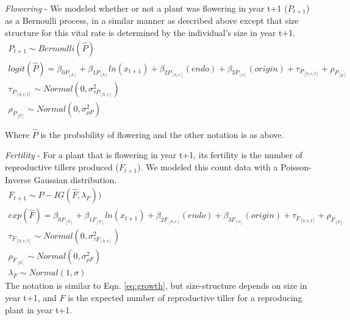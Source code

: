 \documentclass[12pt]{article}
\begin{document}
\emph{Flowering} - We modeled whether or not a plant was flowering in year t+1 ($P_{t+1}$) as a Bernoulli process, in a similar manner as described above except that size structure for this vital rate is determined by the individual's size in year t+1.
\begin{subequations} 
	\label{eq:flowering}
	\begin{align}
		P_{t+1} \sim Bernoulli(\hat{P}) \\
		logit(\hat{P}) =  \beta_{0P_{[h]}} + \beta_{1P_{[h]}}ln(x_{t+1}) + \beta_{2P_{[h,e]}}(endo) + \beta_{3P_{[o]}}(origin) + \tau_{P_{[h,e,t]}} + \rho_{P_{[p]}} \\
		\tau_{P_{[h,e,t]}} \sim Normal(0, \sigma^2_{\tau P_{[h,e]}})\\
		\rho_{P_{[p]}} \sim Normal(0, \sigma^2_{\rho P})
	\end{align}
\end{subequations}

Where $\hat{P}$ is the probability of flowering and the other notation is as above.

\emph{Fertility} - For a plant that is flowering in year t+1, its fertility is the number of reproductive tillers produced ($F_{t+1}$). 
We modeled this count data with a Poisson-Inverse Gaussian distribution.
\begin{subequations} 
	\label{eq:fertility}
	\begin{align}
		F_{t+1} \sim P-IG(\hat{F},\lambda_{F})) \\
		exp(\hat{F}) =  \beta_{0F_{[h]}} + \beta_{1F_{[h]}}ln(x_{t+1}) + \beta_{2F_{[h,e]}}(endo) + \beta_{3F_{[o]}}(origin) + \tau_{F_{[h,e,t]}} + \rho_{F_{[p]}} \\
		\tau_{F_{[h,e,t]}} \sim Normal(0, \sigma^2_{\tau F_{[h,e]}})\\
		\rho_{F_{[p]}} \sim Normal(0, \sigma^2_{\rho F})\\
		\lambda_{F} \sim Normal(1,\sigma)
	\end{align}
\end{subequations}
The notation is similar to Eqn. \ref{eq:growth}, but size-structure depends on size in year t+1, and $\hat{F}$ is the expected number of reproductive tiller for a reproducing plant in year t+1.
\end{document}
